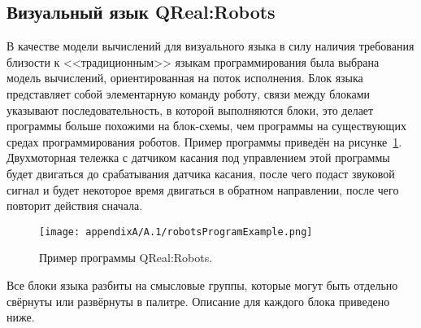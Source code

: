 \subsection{Визуальный язык QReal:Robots}
В качестве модели вычислений для визуального языка в силу наличия требования близости 
к <<традиционным>> языкам программирования была выбрана модель вычислений, ориентированная 
на поток исполнения. Блок языка представляет собой элементарную команду роботу, связи 
между блоками указывают последовательность, в которой выполняются блоки, это делает 
программы больше похожими на блок-схемы, чем программы на существующих средах программирования 
роботов. Пример программы приведён на рисунке~\ref{image:robotsProgramExample}. Двухмоторная 
тележка с датчиком касания под управлением этой программы будет двигаться до срабатывания 
датчика касания, после чего подаст звуковой сигнал и будет некоторое время двигаться 
в обратном направлении, после чего повторит действия сначала.

\begin{figure} [ht]
	\begin{center}
		\texttt{[image: appendixA/A.1/robotsProgramExample.png]}
		\caption{Пример программы QReal:Robots.}
		\label{image:robotsProgramExample}
	\end{center}
\end{figure}

Все блоки языка разбиты на смысловые группы, которые могут быть отдельно свёрнуты 
или развёрнуты в палитре. Описание для каждого блока приведено ниже.


